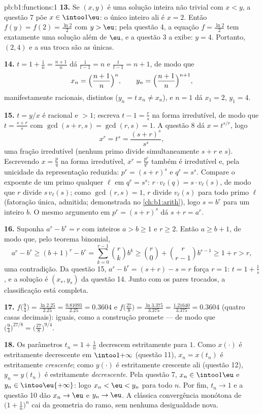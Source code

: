\begin{solution}{pb:b1:functions:1}
\textbf{13.} Se $(x, y)$ é uma solução inteira não trivial com $x
< y$, a questão 7 põe $x \in \intoo1\eu$: o único inteiro ali
é $x = 2$. Então $f(y) = f(2) = \frac{\ln2}2$ com $y > \eu$; pela
questão 4, a equação $f = \frac{\ln2}2$ tem exatamente uma
solução além de $\eu$, e a questão 3 a exibe: $y = 4$. Portanto,
$(2, 4)$ e a sua troca são as únicas.

\textbf{14.} $t = 1 + \frac1n = \frac{n+1}n$ dá $\frac1{t - 1}
= n$ e $\frac t{t-1} = n + 1$, de modo que
\[
x_n = \Bigl(\frac{n+1}n\Bigr)^{n},
\qquad
y_n = \Bigl(\frac{n+1}n\Bigr)^{n+1},
\]
manifestamente racionais, distintos ($y_n = t\,x_n \neq x_n$), e $n =
1$ dá $x_1 = 2$, $y_1 = 4$.

\textbf{15.} $t = y/x$ é racional e $> 1$; escreva $t - 1 =
\frac rs$ na forma irredutível, de modo que $t = \frac{s + r}s$ com $\gcd(s +
r, s) = \gcd(r, s) = 1$. A questão 8 dá $x = t^{s/r}$, logo
\[
x^r = t^s = \frac{(s+r)^s}{s^s} ,
\]
uma fração irredutível (nenhum primo divide simultaneamente $s + r$ e
$s$). Escrevendo $x = \frac pq$ na forma irredutível, $x^r = \frac{p^r}
{q^r}$ também é irredutível e, pela unicidade da
representação reduzida: $p^r = (s+r)^s$ e $q^r = s^s$. Compare o
expoente de um primo qualquer $\ell$ em $q^r = s^s$: $r \cdot
v_\ell(q) = s \cdot v_\ell(s)$, de modo que $r$ divide $s\,v_\ell(s)$;
como $\gcd(r, s) = 1$, $r$ divide $v_\ell(s)$ para todo primo
$\ell$ (fatoração única, admitida; demonstrada no
\cref{ch:b1:arith}), logo $s = b^r$ para um inteiro $b$. O mesmo
argumento em $p^r = (s+r)^s$ dá $s + r = a^r$.

\textbf{16.} Suponha $a^r - b^r = r$ com inteiros $a > b \geq 1$
e $r \geq 2$. Então $a \geq b + 1$, de modo que, pelo teorema binomial,
\[
a^r - b^r \geq (b+1)^r - b^r
= \sum_{k=0}^{r-1}\binom rk b^k
\geq \binom r0 + \binom r{r-1} b^{r-1}
\geq 1 + r > r ,
\]
uma contradição. Da questão 15, $a^r - b^r = (s + r) - s = r$
força $r = 1$: $t = 1 + \frac1s$, e a solução é $(x_s,
y_s)$ da questão 14. Junto com os pares trocados, a
classificação está completa.

\textbf{17.} $f\bigl(\tfrac94\bigr) = \frac{\ln 2.25}{2.25} =
\frac{0.81093}{2.25} = 0.3604$ e $f\bigl(\tfrac{27}8\bigr) =
\frac{\ln 3.375}{3.375} = \frac{1.21640}{3.375} = 0.3604$ (quatro
casas decimais): iguais, como a construção promete --- de modo que
$\bigl(\tfrac94\bigr)^{27/8} = \bigl(\tfrac{27}8\bigr)^{9/4}$.

\textbf{18.} Os parâmetros $t_n = 1 + \frac1n$ decrescem estritamente
para $1$. Como $x(\cdot)$ é estritamente decrescente em
$\intoo1{+\infty}$ (questão 11), $x_n = x(t_n)$ é estritamente
\emph{crescente}; como $y(\cdot)$ é estritamente crescente ali
(questão 12), $y_n = y(t_n)$ é estritamente \emph{decrescente}. Pela
questão 7, $x_n \in \intoo1\eu$ e $y_n \in
\intoo\eu{+\infty}$: logo $x_n < \eu < y_n$ para todo $n$. Por fim,
$t_n \to 1$ e a questão 10 dão $x_n \to \eu$ e $y_n \to \eu$.
A clássica convergência monótona de $\bigl(1 +
\frac1n\bigr)^n$ cai da geometria do ramo, sem nenhuma
desigualdade nova.


\end{solution}
